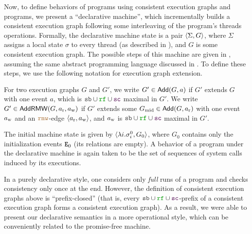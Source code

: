 Now, to define behaviors of programs using consistent 
execution graphs and programs, we present a ``declarative machine'', 
which incrementally builds a consistent execution graph
following some interleaving of the program's threads operations.
Formally, the declarative machine state is a pair ${\langle{\Sigma,G}\rangle}$, 
where $\Sigma$ assigns a local state $\sigma$ to every thread
(as described in ), and $G$ is some consistent execution graph.
The possible steps of this machine are given in ,
assuming the same abstract programming language discussed  in .
To define these steps, we use the following notation for execution graph extension.

\begin{notation}
For two execution graphs $G$ and $G'$,
we write $G'\in\mathsf{Add}({G,a})$
if $G'$ extends $G$ with one event $a$,
which is $\lSB\cup\lRF\cup\lSC$ maximal in $G'$.
We write $G'\in\textsf{AddRMW}({G,a_{\text{r}},a_{\text{w}}})$
if $G'$ extends some $G_{\text{mid}}\in \mathsf{Add}({G,a_{\text{r}}})$ with 
one event $a_{\text{w}}$ and an $\lRMW$-edge ${\langle{a_{\text{r}},a_{\text{w}}}\rangle}$,
and $a_{\text{w}}$ is $\lSB\cup\lRF\cup\lSC$ maximal in $G'$.
\end{notation}

The initial machine state is given by ${\langle{\lambda i.\sigma_i^0, G_0}\rangle}$,
where $G_0$ contains only the initialization events ${\texttt{E}}_0$ (its relations are empty).
A behavior of a program under the declarative machine 
is again taken to be the set of sequences of system calls induced by its executions.

\begin{remark}
In a purely declarative style, one considers only \emph{full} runs of a program and checks consistency only once at the end.
However, the definition of consistent execution graphs above is ``prefix-closed''
(that is, every $\lSB\cup\lRF\cup\lSC$-prefix of a consistent execution graph forms a consistent execution graph).  As a result, we were able to present our declarative
semantics in a more operational style,
which can be conveniently related to the promise-free machine.
\end{remark}

